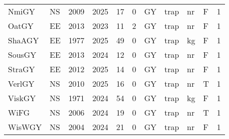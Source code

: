 \begin{table}[htbp]
\begin{tabular}{p{1cm}p{1cm}p{1cm}p{1cm}p{0.8cm}p{0.8cm}p{1cm}p{2cm}p{2cm}p{1cm}p{1cm}}
  NmiGY & NS & 2009 & 2025 & 17 & 0 & GY & trap & nr & F & 1 \\ 
  OatGY & EE & 2013 & 2023 & 11 & 2 & GY & trap & nr & F & 1 \\ 
  ShaAGY & EE & 1977 & 2025 & 49 & 0 & GY & trap & kg & F & 1 \\ 
  SousGY & EE & 2013 & 2024 & 12 & 0 & GY & trap & nr & F & 1 \\ 
  StraGY & EE & 2012 & 2025 & 14 & 0 & GY & trap & nr & F & 1 \\ 
  VerlGY & NS & 2010 & 2025 & 16 & 0 & GY & trap & nr & T & 1 \\ 
  ViskGY & NS & 1971 & 2024 & 54 & 0 & GY & trap & kg & F & 1 \\ 
  WiFG & NS & 2006 & 2024 & 19 & 0 & GY & trap & nr & T & 1 \\ 
  WisWGY & NS & 2004 & 2024 & 21 & 0 & GY & trap & nr & F & 1 \\ 
   \hline
\end{tabular}
\end{table}

